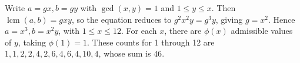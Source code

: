 Write $a=gx,b=gy$ with $\gcd(x,y)=1$ and $1\le y\le x$. Then $\operatorname{lcm}(a,b)=gxy$, so the equation reduces to $g^2x^2y=g^3y$, giving $g=x^2$. Hence $a=x^3,b=x^2y$, with $1\le x\le12$. For each $x$, there are $\phi(x)$ admissible values of $y$, taking $\phi(1)=1$. These counts for 1 through 12 are $1,1,2,2,4,2,6,4,6,4,10,4$, whose sum is $\boxed{46}$.
